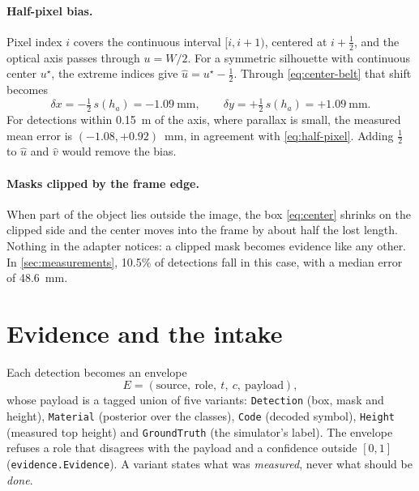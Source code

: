 \documentclass[11pt,a4paper]{article}
\theoremstyle{definition}
\theoremstyle{remark}
\newcommand{\code}[1]{\texttt{#1}}
\begin{document}
\paragraph{Half-pixel bias.}
Pixel index $i$ covers the continuous interval $[i, i+1)$, centered at
$i + \tfrac12$, and the optical axis passes through $u = W/2$. For a symmetric
silhouette with continuous center $u^\star$, the extreme indices give
$\hat u = u^\star - \tfrac12$. Through \eqref{eq:center-belt} that shift becomes
\begin{equation}
\label{eq:half-pixel}
\delta x = -\tfrac12\,s(h_a) = -1.09\ \text{mm},
\qquad
\delta y = +\tfrac12\,s(h_a) = +1.09\ \text{mm}.
\end{equation}
For detections within 0.15~m of the axis, where parallax is small, the measured
mean error is $(-1.08, +0.92)$~mm, in agreement with \eqref{eq:half-pixel}.
Adding $\tfrac12$ to $\hat u$ and $\hat v$ would remove the bias.

\paragraph{Masks clipped by the frame edge.}
When part of the object lies outside the image, the box \eqref{eq:center}
shrinks on the clipped side and the center moves into the frame by about half
the lost length. Nothing in the adapter notices: a clipped mask becomes evidence
like any other. In \cref{sec:measurements}, 10.5\% of detections fall in this
case, with a median error of 48.6~mm.

\section{Evidence and the intake}
\label{sec:evidence}

Each detection becomes an envelope
\begin{equation}
E = (\text{source},\ \text{role},\ t,\ c,\ \text{payload}),
\end{equation}
whose payload is a tagged union of five variants: \code{Detection} (box, mask
and height), \code{Material} (posterior over the classes), \code{Code} (decoded
symbol), \code{Height} (measured top height) and \code{GroundTruth} (the
simulator's label). The envelope refuses a role that disagrees with the payload
and a confidence outside $[0,1]$ (\code{evidence.Evidence}). A variant states
what was \emph{measured}, never what should be \emph{done}.
\end{document}
